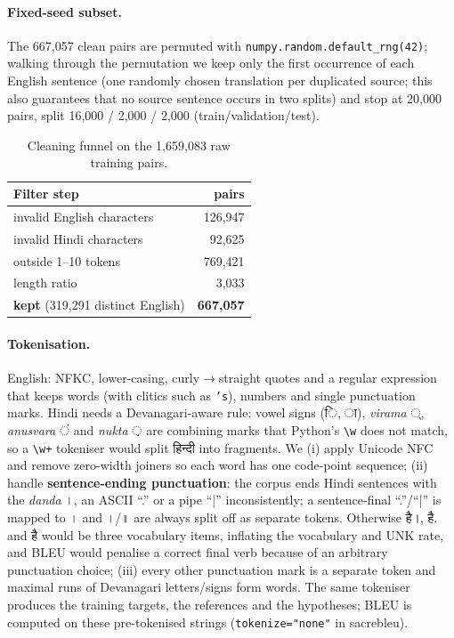 \documentclass[10pt,a4paper]{article}
\newcommand{\hi}[1]{{\hindifont #1}}
\newcommand{\code}[1]{\texttt{#1}}
\begin{document}
\paragraph{Fixed-seed subset.} The 667{,}057 clean pairs are permuted with
\code{numpy.random.default\_rng(42)}; walking through the permutation we keep only the first occurrence of
each English sentence (one randomly chosen translation per duplicated source; this also guarantees that
no source sentence occurs in two splits) and stop at 20{,}000 pairs, split 16{,}000 / 2{,}000 / 2{,}000
(train/validation/test).

\begin{table}[H]
\centering\small
\begin{tabular}{lr}
\toprule
Filter step & pairs \\
\midrule
invalid English characters & 126{,}947 \\
invalid Hindi characters & 92{,}625 \\
outside 1--10 tokens & 769{,}421 \\
length ratio & 3{,}033 \\
\textbf{kept} (319{,}291 distinct English) & \textbf{667{,}057} \\
\bottomrule
\end{tabular}
\caption{Cleaning funnel on the 1{,}659{,}083 raw training pairs.}
\label{tab:funnel}
\end{table}

\paragraph{Tokenisation.} English: NFKC, lower-casing, curly$\to$straight quotes and a regular expression
that keeps words (with clitics such as \code{'s}), numbers and single punctuation marks. Hindi needs a
Devanagari-aware rule: vowel signs (\hi{ि}, \hi{ा}), \emph{virama} \hi{्}, \emph{anusvara} \hi{ं} and
\emph{nukta} \hi{़} are combining marks that Python's \verb|\w| does not match, so a \verb|\w+| tokeniser
would split \hi{हिन्दी} into fragments. We (i) apply Unicode NFC and remove zero-width joiners so each word
has one code-point sequence; (ii) handle \textbf{sentence-ending punctuation}: the corpus ends Hindi
sentences with the \emph{danda} \hi{।}, an ASCII ``.'' or a pipe ``|'' inconsistently; a sentence-final
``.''/``|'' is mapped to \hi{।} and \hi{।}/\hi{॥} are always split off as separate tokens. Otherwise
\hi{है।}, \hi{है.} and \hi{है} would be three vocabulary items, inflating the vocabulary and UNK rate, and
BLEU would penalise a correct final verb because of an arbitrary punctuation choice; (iii) every other
punctuation mark is a separate token and maximal runs of Devanagari letters/signs form words. The same
tokeniser produces the training targets, the references and the hypotheses; BLEU is computed on these
pre-tokenised strings (\code{tokenize="none"} in sacrebleu).
\end{document}

